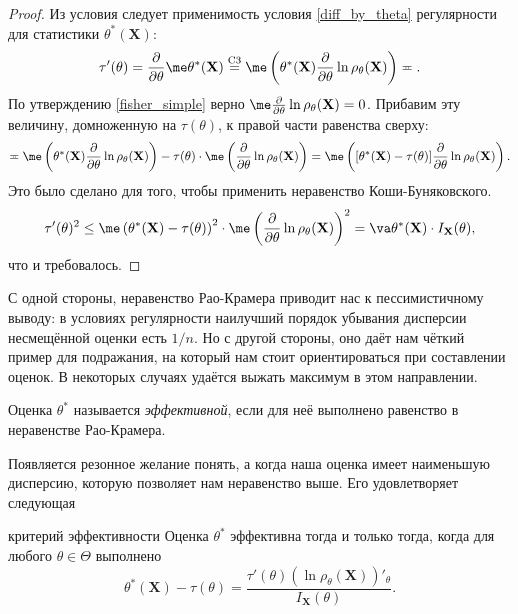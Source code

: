 \begin{proof}
    Из условия следует применимость условия \ref{diff_by_theta} регулярности для статистики $\theta^*(\mathbf X)$:
    \[
    \tau'(\theta) = \frac{\partial}{\partial \theta} \me \theta^*(\mathbf X) \stackrel{\text{C3}}{=} \me \left(\theta^*(\mathbf X) \frac{\partial}{\partial\theta}\ln{\rho_{\theta}(\mathbf X)}\right) \eqcirc.
    \]
    По утверждению \ref{fisher_simple} верно $\me \frac{\partial}{\partial \theta} \ln{\rho_{\theta}(\mathbf X)} = 0$. Прибавим эту величину, домноженную на $\tau(\theta)$, к правой части равенства сверху:
    \[
    \eqcirc \me \left(\theta^*(\mathbf X) \frac{\partial}{\partial\theta}\ln{\rho_{\theta}(\mathbf X)}\right) - \tau(\theta) \cdot \me \left(\frac{\partial}{\partial\theta}\ln{\rho_{\theta}(\mathbf X)}\right) = \me \left([\theta^*(\mathbf X) - \tau(\theta)] \frac{\partial}{\partial\theta}\ln{\rho_{\theta}(\mathbf X)}\right).
    \]
    Это было сделано для того, чтобы применить неравенство Коши-Буняковского.
    \[
    \tau'(\theta)^2 \le \me \left(\theta^*(\mathbf X) - \tau(\theta)\right)^2 \cdot \me \left(\frac{\partial}{\partial\theta}\ln{\rho_{\theta}(\mathbf X)}\right)^2 = \va \theta^*(\mathbf X) \cdot I_{\mathbf X}(\theta),
    \]
    что и требовалось.
\end{proof}

С одной стороны, неравенство Рао-Крамера приводит нас к пессимистичному выводу: в условиях регулярности наилучший порядок убывания дисперсии несмещённой оценки есть $1/n$. Но с другой стороны, оно даёт нам чёткий пример для подражания, на который нам стоит ориентироваться при составлении оценок. В некоторых случаях удаётся выжать максимум в этом направлении.

\begin{definition}
    Оценка $\theta^*$ называется \textit{эффективной}, если для неё выполнено равенство в неравенстве Рао-Крамера.
\end{definition}

Появляется резонное желание понять, а когда наша оценка имеет наименьшую дисперсию, которую позволяет нам неравенство выше. Его удовлетворяет следующая

\begin{theorem}{критерий эффективности}{}
    Оценка $\theta^*$ эффективна тогда и только тогда, когда для любого $\theta \in \Theta$ выполнено
    \[
    \theta^*(\mathbf X) - \tau(\theta) = \frac{\tau'(\theta)(\ln{\rho_{\theta}(\mathbf X)})'_{\theta}}{I_{\mathbf X}(\theta)}.
    \]
\end{theorem}

